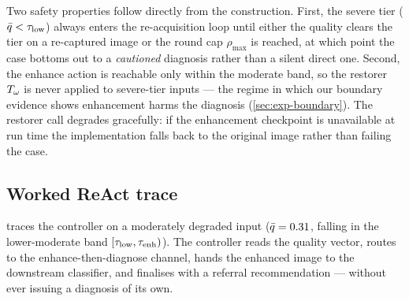 Two safety properties follow directly from the construction. First, the severe
tier ($\bar{q}<\tau_{\mathrm{low}}$) always enters the re-acquisition loop until either the
quality clears the tier on a re-captured image or the round cap $\rho_{\max}$ is
reached, at which point the case bottoms out to a \emph{cautioned} diagnosis
rather than a silent direct one. Second, the enhance action is reachable only
within the moderate band, so the restorer $T_\omega$ is never applied to severe-tier
inputs --- the regime in which our boundary evidence shows enhancement harms the
diagnosis (\cref{sec:exp-boundary}). The restorer call degrades gracefully: if
the enhancement checkpoint is unavailable at run time the implementation falls
back to the original image rather than failing the case.

\subsection{Worked ReAct trace}\label{app:a5-trace}

 traces the controller on a moderately degraded input
($\bar{q}=0.31$, falling in the lower-moderate band $[\tau_{\mathrm{low}},\tau_{\mathrm{enh}})$). The
controller reads the quality vector, routes to the enhance-then-diagnose
channel, hands the enhanced image to the downstream classifier, and finalises
with a referral recommendation --- without ever issuing a diagnosis of its own.

